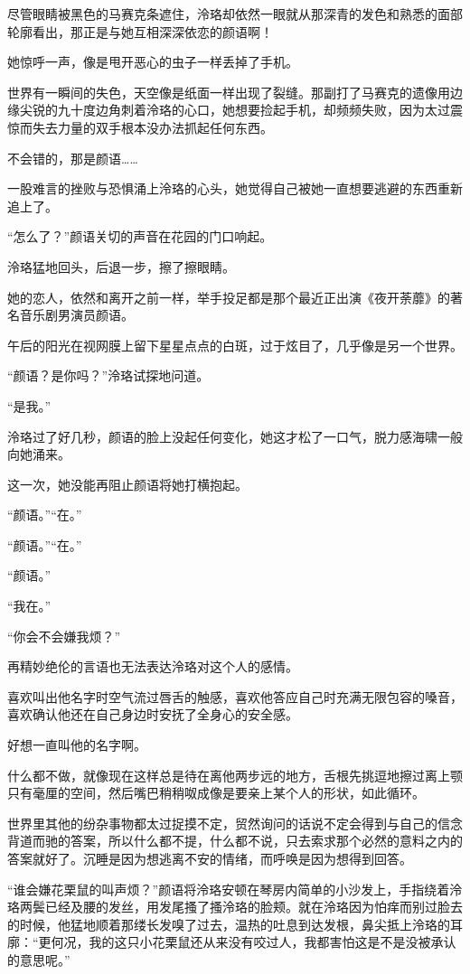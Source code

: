 \documentclass[UTF8, scheme = chinese, openany]{ctexbook}
\begin{document}
尽管眼睛被黑色的马赛克条遮住，泠珞却依然一眼就从那深青的发色和熟悉的面部轮廓看出，那正是与她互相深深依恋的颜语啊！

她惊呼一声，像是甩开恶心的虫子一样丢掉了手机。

世界有一瞬间的失色，天空像是纸面一样出现了裂缝。那副打了马赛克的遗像用边缘尖锐的九十度边角刺着泠珞的心口，她想要捡起手机，却频频失败，因为太过震惊而失去力量的双手根本没办法抓起任何东西。

不会错的，那是颜语……

一股难言的挫败与恐惧涌上泠珞的心头，她觉得自己被她一直想要逃避的东西重新追上了。

“怎么了？”颜语关切的声音在花园的门口响起。

泠珞猛地回头，后退一步，擦了擦眼睛。

她的恋人，依然和离开之前一样，举手投足都是那个最近正出演《夜开荼蘼》的著名音乐剧男演员颜语。

午后的阳光在视网膜上留下星星点点的白斑，过于炫目了，几乎像是另一个世界。

“颜语？是你吗？”泠珞试探地问道。

“是我。”

泠珞过了好几秒，颜语的脸上没起任何变化，她这才松了一口气，脱力感海啸一般向她涌来。

这一次，她没能再阻止颜语将她打横抱起。

“颜语。”“在。”

“颜语。”“在。”

“颜语。”

“我在。”

“你会不会嫌我烦？”

再精妙绝伦的言语也无法表达泠珞对这个人的感情。

喜欢叫出他名字时空气流过唇舌的触感，喜欢他答应自己时充满无限包容的嗓音，喜欢确认他还在自己身边时安抚了全身心的安全感。

好想一直叫他的名字啊。

什么都不做，就像现在这样总是待在离他两步远的地方，舌根先挑逗地擦过离上颚只有毫厘的空间，然后嘴巴稍稍呶成像是要亲上某个人的形状，如此循环。

世界里其他的纷杂事物都太过捉摸不定，贸然询问的话说不定会得到与自己的信念背道而驰的答案，所以什么都不提，什么都不说，只去索求那个必然的意料之内的答案就好了。沉睡是因为想逃离不安的情绪，而呼唤是因为想得到回答。

“谁会嫌花栗鼠的叫声烦？”颜语将泠珞安顿在琴房内简单的小沙发上，手指绕着泠珞两鬓已经及腰的发丝，用发尾搔了搔泠珞的脸颊。就在泠珞因为怕痒而别过脸去的时候，他猛地顺着那缕长发嗅了过去，温热的吐息到达发根，鼻尖抵上泠珞的耳廓：“更何况，我的这只小花栗鼠还从来没有咬过人，我都害怕这是不是没被承认的意思呢。”
\end{document}
